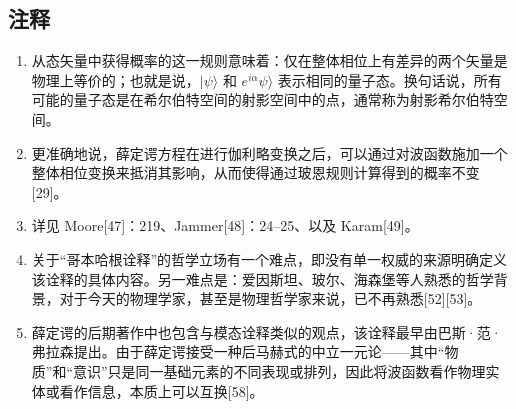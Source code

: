 \subsection{注释}
\begin{enumerate}
\item 从态矢量中获得概率的这一规则意味着：仅在整体相位上有差异的两个矢量是物理上等价的；也就是说，$|\psi\rangle$ 和 $e^{i\alpha}\psi\rangle$ 表示相同的量子态。换句话说，所有可能的量子态是在希尔伯特空间的射影空间中的点，通常称为射影希尔伯特空间。
\item 更准确地说，薛定谔方程在进行伽利略变换之后，可以通过对波函数施加一个整体相位变换来抵消其影响，从而使得通过玻恩规则计算得到的概率不变[29]。
\item 详见 Moore[47]：219、Jammer[48]：24–25、以及 Karam[49]。
\item 关于“哥本哈根诠释”的哲学立场有一个难点，即没有单一权威的来源明确定义该诠释的具体内容。另一难点是：爱因斯坦、玻尔、海森堡等人熟悉的哲学背景，对于今天的物理学家，甚至是物理哲学家来说，已不再熟悉[52][53]。
\item 薛定谔的后期著作中也包含与模态诠释类似的观点，该诠释最早由巴斯·范·弗拉森提出。由于薛定谔接受一种后马赫式的中立一元论——其中“物质”和“意识”只是同一基础元素的不同表现或排列，因此将波函数看作物理实体或看作信息，本质上可以互换[58]。
\end{enumerate}
